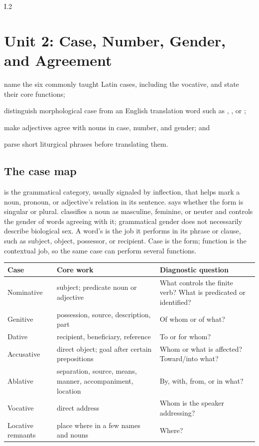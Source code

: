 \begin{courseunit}{I.2}
\chapter{Unit 2: Case, Number, Gender, and Agreement}

\begin{learningobjectives}
  \item name the six commonly taught Latin cases, including the vocative, and
        state their core functions;
  \item distinguish morphological case from an English translation word such
        as , , or ;
  \item make adjectives agree with nouns in case, number, and gender; and
  \item parse short liturgical phrases before translating them.
\end{learningobjectives}

\section{The case map}

 is the grammatical category, usually signaled by inflection, that
helps mark a noun, pronoun, or adjective's relation in its sentence.
 says whether the form is
singular or plural.  classifies a noun as masculine, feminine, or
neuter and controls the gender of words agreeing with it; grammatical gender
does not necessarily describe biological sex. A word's  is the job it performs in its phrase or clause, such as subject,
object, possessor, or recipient. Case is the form; function is the contextual
job, so the same case can perform several functions.

\begin{center}\small
\begin{tabularx}{\linewidth}{@{}P{0.92in}P{2.1in}Y@{}}
\toprule
\textbf{Case} & \textbf{Core work} & \textbf{Diagnostic question} \\
\midrule
Nominative & subject; predicate noun or adjective & What controls the finite
verb? What is predicated or identified? \\
Genitive & possession, source, description, part & Of whom or of what? \\
Dative & recipient, beneficiary, reference & To or for whom? \\
Accusative & direct object; goal after certain prepositions & Whom or what is
affected? Toward/into what? \\
Ablative & separation, source, means, manner, accompaniment, location & By,
with, from, or in what? \\
Vocative & direct address & Whom is the speaker addressing? \\
Locative remnants & place where in a few names and nouns & Where? \\
\bottomrule
\end{tabularx}
\end{center}


\end{courseunit}
